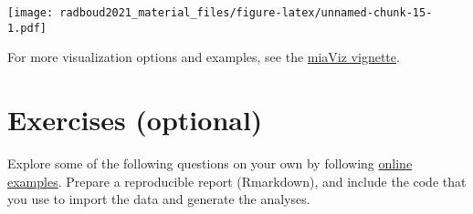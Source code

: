 \documentclass[
]{book}
\begin{document}
\texttt{[image: radboud2021\_material\_files/figure-latex/unnamed-chunk-15-1.pdf]}

For more visualization options and examples, see the \href{https://microbiome.github.io/miaViz/articles/miaViz.html}{miaViz vignette}.

\hypertarget{exercises-optional}{%
\section{Exercises (optional)}\label{exercises-optional}}

Explore some of the following questions on your own by following
\href{https://microbiome.github.io/OMA/}{online examples}. Prepare a
reproducible report (Rmarkdown), and include the code that you use to
import the data and generate the analyses.
\end{document}
